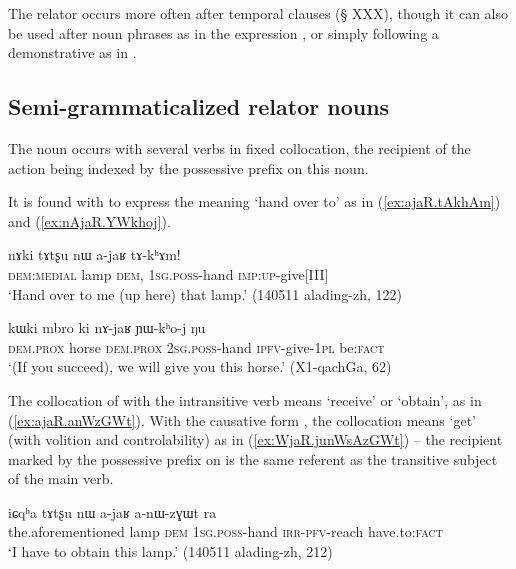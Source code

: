 The relator  occurs more often after temporal clauses (§ XXX), though it can also be used after noun phrases as in the expression , or simply following a demonstrative as in .

\subsection{Semi-grammaticalized relator nouns} \label{sec:semi.grammaticalized.relator} 
The noun  occurs with several verbs in fixed collocation, the recipient of the action being indexed by the possessive prefix on this noun.

It is found with  to express the meaning `hand over to' as in (\ref{ex:ajaR.tAkhAm}) and (\ref{ex:nAjaR.YWkhoj}).

\begin{exe}
\ex \label{ex:ajaR.tAkhAm}
\gll nɤki tɤtʂu nɯ a-jaʁ tɤ-kʰɤm! \\
\textsc{dem}:\textsc{medial} lamp \textsc{dem}, \textsc{1sg}.\textsc{poss}-hand \textsc{imp}:\textsc{up}-give[III] \\
\glt `Hand over to me (up here) that lamp.' (140511 alading-zh, 122)
\end{exe}

\begin{exe}
\ex \label{ex:nAjaR.YWkhoj}
\gll kɯki mbro ki nɤ-jaʁ ɲɯ-kʰo-j ŋu \\
\textsc{dem}.\textsc{prox} horse \textsc{dem}.\textsc{prox} \textsc{2sg}.\textsc{poss}-hand \textsc{ipfv}-give-\textsc{1pl} be:\textsc{fact} \\
\glt  `(If you succeed), we will give you this horse.'  (X1-qachGa, 62)
\end{exe}

The collocation of  with the intransitive verb  means `receive' or `obtain', as in (\ref{ex:ajaR.anWzGWt}). With the causative form , the collocation means `get' (with volition and controlability) as in (\ref{ex:WjaR.junWsAzGWt}) -- the recipient marked by the possessive prefix on   is the same referent as the transitive subject of the main verb.

\begin{exe}
\ex \label{ex:ajaR.anWzGWt}
\gll iɕqʰa tɤtʂu nɯ a-jaʁ a-nɯ-zɣɯt ra \\
the.aforementioned lamp \textsc{dem} \textsc{1sg}.\textsc{poss}-hand \textsc{irr}-\textsc{pfv}-reach have.to:\textsc{fact} \\
\glt   `I have to obtain this lamp.' (140511 alading-zh, 212)
\end{exe}

